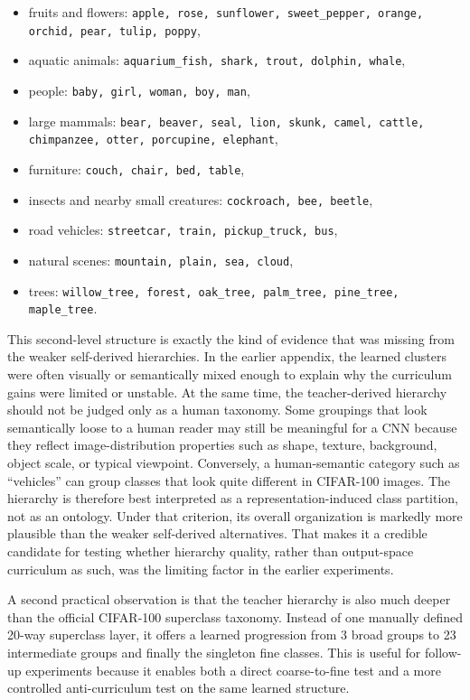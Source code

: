 \begin{itemize}
    \item fruits and flowers: \texttt{apple, rose, sunflower, sweet\_pepper,
          orange, orchid, pear, tulip, poppy},
    \item aquatic animals: \texttt{aquarium\_fish, shark, trout, dolphin,
          whale},
    \item people: \texttt{baby, girl, woman, boy, man},
    \item large mammals: \texttt{bear, beaver, seal, lion, skunk, camel,
          cattle, chimpanzee, otter, porcupine, elephant},
    \item furniture: \texttt{couch, chair, bed, table},
    \item insects and nearby small creatures: \texttt{cockroach, bee,
          beetle},
    \item road vehicles: \texttt{streetcar, train, pickup\_truck, bus},
    \item natural scenes: \texttt{mountain, plain, sea, cloud},
    \item trees: \texttt{willow\_tree, forest, oak\_tree, palm\_tree,
          pine\_tree, maple\_tree}.
\end{itemize}

This second-level structure is exactly the kind of evidence that was missing
from the weaker self-derived hierarchies. In the earlier appendix, the learned
clusters were often visually or semantically mixed enough to explain why the
curriculum gains were limited or unstable. At the same time, the teacher-derived
hierarchy should not be judged only as a human taxonomy. Some groupings that
look semantically loose to a human reader may still be meaningful for a CNN
because they reflect image-distribution properties such as shape, texture,
background, object scale, or typical viewpoint. Conversely, a human-semantic
category such as ``vehicles'' can group classes that look quite different in
CIFAR-100 images. The hierarchy is therefore best interpreted as a
representation-induced class partition, not as an ontology. Under that criterion,
its overall organization is markedly more plausible than the weaker
self-derived alternatives. That makes it a credible candidate for testing
whether hierarchy quality, rather than output-space curriculum as such, was the
limiting factor in the earlier experiments.

A second practical observation is that the teacher hierarchy is also much deeper
than the official CIFAR-100 superclass taxonomy. Instead of one manually defined
20-way superclass layer, it offers a learned progression from 3 broad groups to
23 intermediate groups and finally the singleton fine classes. This is useful
for follow-up experiments because it enables both a direct coarse-to-fine test
and a more controlled anti-curriculum test on the same learned structure.

